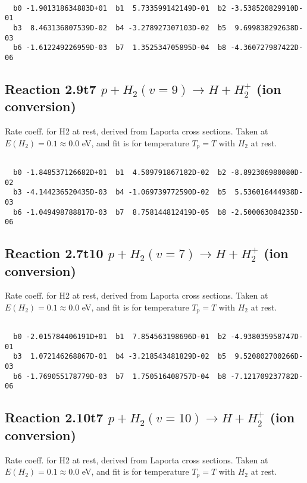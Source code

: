 \begin{small}\begin{verbatim}

  b0 -1.901318634883D+01  b1  5.733599142149D-01  b2 -3.538520829910D-01
  b3  8.463136807539D-02  b4 -3.278927307103D-02  b5  9.699838292638D-03
  b6 -1.612249226959D-03  b7  1.352534705895D-04  b8 -4.360727987422D-06

\end{verbatim}\end{small}

\newpage
\subsection{
Reaction 2.9t7
$ p + H_2(v=9) \rightarrow H + H_2^+$ (ion conversion)
}
Rate coeff. for H2 at rest, derived from Laporta cross sections.
Taken at $E(H_2) = 0.1 \approx 0.0$ eV,  and fit is for temperature $T_p=T$ with $H_2$ at rest.

\begin{small}\begin{verbatim}

  b0 -1.848537126682D+01  b1  4.509791867182D-02  b2 -8.892306980080D-02
  b3 -4.144236520435D-03  b4 -1.069739772590D-02  b5  5.536016444938D-03
  b6 -1.049498788817D-03  b7  8.758144812419D-05  b8 -2.500063084235D-06

\end{verbatim}\end{small}

\newpage
\subsection{
Reaction 2.7t10
$ p + H_2(v=7) \rightarrow H + H_2^+$ (ion conversion)
}
Rate coeff. for H2 at rest, derived from Laporta cross sections.
Taken at $E(H_2) = 0.1 \approx 0.0$ eV,  and fit is for temperature $T_p=T$ with $H_2$ at rest.

\begin{small}\begin{verbatim}

  b0 -2.015784406191D+01  b1  7.854563198696D-01  b2 -4.938035958747D-01
  b3  1.072146268867D-01  b4 -3.218543481829D-02  b5  9.520802700266D-03
  b6 -1.769055178779D-03  b7  1.750516408757D-04  b8 -7.121709237782D-06

\end{verbatim}\end{small}

\newpage
\subsection{
Reaction 2.10t7
$ p + H_2(v=10) \rightarrow H + H_2^+$ (ion conversion)
}
Rate coeff. for H2 at rest, derived from Laporta cross sections.
Taken at $E(H_2) = 0.1 \approx 0.0$ eV,  and fit is for temperature $T_p=T$ with $H_2$ at rest.

